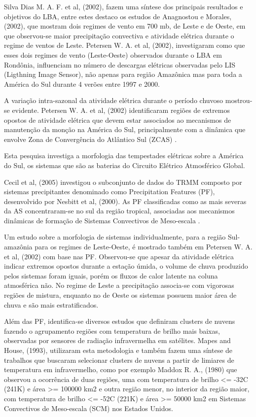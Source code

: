 Silva Dias M. A. F. et al, (2002), fazem uma síntese dos principais resultados e objetivos do LBA, entre estes destaco os estudos de Anagnostou e Morales, (2002), \cite{mais autores tbm} que mostram dois regimes de vento em 700 mb, de Leste e de Oeste, em que observou-se maior precipitação convectiva e atividade elétrica durante o regime de ventos de Leste. Petersen W. A. et al, (2002), investigaram como que esses dois regimes de vento (Leste-Oeste) observados durante o LBA em Rondônia, influenciam no número de descargas elétricas observadas pelo LIS (Ligthning Image Sensor), não apenas para região Amazônica mas para toda a América do Sul durante 4 verões entre 1997 e 2000.

A variação intra-sazonal da atividade elétrica durante o período chuvoso mostrou-se evidente. Petersen W. A. et al, (2002) identificaram regiões de extremos opostos de atividade elétrica que devem estar associados ao mecanismos de manutenção da monção na América do Sul, principalmente com a dinâmica que envolve Zona de Convergência do Atlântico Sul (ZCAS) \cite{ breack fase monson }.   

Esta pesquisa investiga a morfologia das tempestades elétricas sobre a América do Sul, os sistemas que são as baterias do Circuito Elétrico Atmosférico Global. 

Cecil et al, (2005) investigou o subconjunto de dados do TRMM composto por sistemas precipitantes denominado como Precipitation Features (PF), desenvolvido por Nesbitt et al, (2000). As PF classificadas como as mais severas da AS concentraram-se no sul da região tropical, associadas aos mecanismos dinâmicas de formação de Sistemas Convectivos de Meso-escala \cite{quem descreve SCM na AS?}. 

Um estudo sobre a morfologia de sistemas individualmente, para a região Sul- amazônia para os regimes de Leste-Oeste, é mostrado também em Petersen W. A. et al, (2002) com base nas PF. Observou-se que apesar da atividade elétrica indicar extremos opostos durante a estação úmida, o volume de chuva produzido pelos sistemas foram iguais, porém os fluxos de calor latente na coluna atmosférica não. No regime de Leste a precipitação associa-se com vigorosas regiões de mistura, enquanto no de Oeste os sistemas possuem maior área de chuva e são mais estratificados.

Além das PF, identifica-se diversos estudos que definiram clusters de nuvens fazendo o agrupamento regiões com temperatura de brilho mais baixas, observadas por sensores de radiação infravermelha em satélites.  Mapes and House, (1993), utilizaram esta metodologia e também fazem uma síntese de trabalhos que buscaram selecionar clusters de nuvens a partir de limiares de temperatura em infravermelho, como por exemplo Maddox R. A., (1980) que observou a ocorrência de duas regiões, uma com temperatura de brilho <= -32C (241K) e área >= 100000 km2 e outra região menor, no interior da região maior, com temperatura de brilho <= -52C (221K) e área >= 50000 km2 em Sistemas Convectivos de Meso-escala (SCM) nos Estados Unidos.

